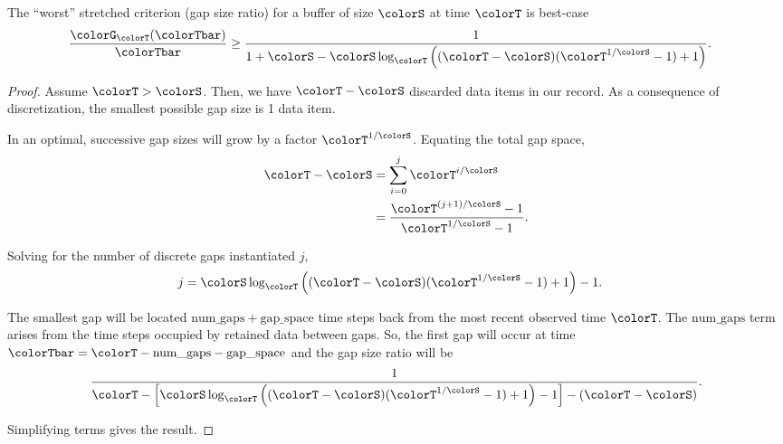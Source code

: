 \begin{lemma}
\label{thm:stretched-ideal-strict}
The ``worst'' stretched criterion (gap size ratio) for a buffer of size $\colorS$ at time $\colorT$ is best-case
\begin{align*}
\frac{\colorG_{\colorT}(\colorTbar)}{\colorTbar}
&\geq
\frac{
  1
}{
  1 + \colorS
  - \colorS \log_{\colorT}\Big(
    (\colorT - \colorS)(\colorT^{1/\colorS} - 1) + 1
  \Big)
}.
\end{align*}
\end{lemma}

\begin{proof}
Assume $\colorT > \colorS$.
Then, we have $\colorT - \colorS$ discarded data items in our record.
As a consequence of discretization, the smallest possible gap size is 1 data item.

In an optimal, successive gap sizes will grow by a factor $\colorT^{1/\colorS}$.
Equating the total gap space,
\begin{align*}
\colorT - \colorS
&=
\sum_{i = 0}^{j} \colorT^{i/\colorS} %
\\
&=
\frac{
  \colorT^{(j + 1)/\colorS} - 1
}{
  \colorT^{1/\colorS} - 1
}.
\end{align*}

Solving for the number of discrete gaps instantiated $j$,
\begin{align*}
j
&=
\colorS \log_{\colorT}\Big(
  (\colorT - \colorS)(\colorT^{1/\colorS} - 1) + 1
\Big) - 1.
\end{align*}

The smallest gap will be located $\mathrm{num\_gaps} + \mathrm{gap\_space}$ time steps back from the most recent observed time $\colorT$.
The $\mathrm{num\_gaps}$ term arises from the time steps occupied by retained data between gaps.
So, the first gap will occur at time $\colorTbar = \colorT - \mathrm{num\_gaps} - \mathrm{gap\_space}$ and the gap size ratio will be
\begin{align*}
\frac{1}{
\colorT
- \Big[
\colorS \log_{\colorT}\Big(
  (\colorT - \colorS)(\colorT^{1/\colorS} - 1) + 1
\Big) - 1
\Big] - (\colorT - \colorS)
}.
\end{align*}

Simplifying terms gives the result.
\end{proof}
